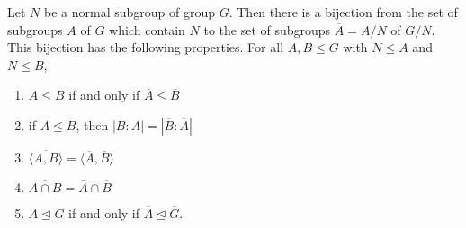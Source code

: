 \begin{theorem}
\label{FourthIsoTheorem}
    Let $N$ be a normal subgroup of group $G$. Then there is a bijection from the set of subgroups $A$ of $G$ which contain $N$ to the set of subgroups $\overline A=A/N$ of $G/N$. This bijection has the following properties. For all $A,B\leq G$ with $N\leq A$ and $N\leq B$,
    \begin{enumerate}
        \item $A\leq B$ if and only if $\overline A\leq\overline B$
        \item if $A\leq B$, then $|B:A|=|\overline B:\overline A|$
        \item $\overline{\langle A,B\rangle}=\langle\overline A,\overline B\rangle$
        \item $\overline{A\cap B}=\overline A\cap\overline B$
        \item $A\unlhd G$ if and only if $\overline A\unlhd\overline G$.
    \end{enumerate}
\end{theorem}

